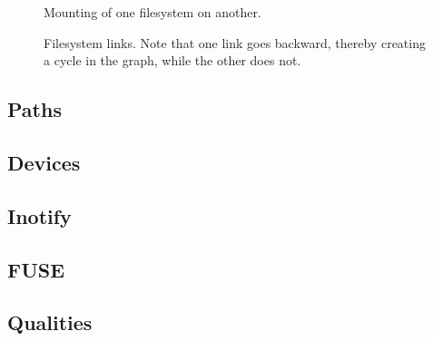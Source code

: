 
\begin{figure}[tbp]
  \begin{center}
  \end{center}
  \caption{Mounting of one filesystem on another.}
  \label{fig:topics:fs:mount}
\end{figure}


\begin{figure}[tbp]
  \begin{center}
  \end{center}
  \caption[Filesystem links]{Filesystem links. Note that one link goes backward, thereby creating a cycle in the graph, while the other does not.}
  \label{fig:topics:fs:links}
\end{figure}

\subsection{Paths}




\subsection{Devices}

\subsection{Inotify}

\subsection{FUSE}

\subsection{Qualities}

